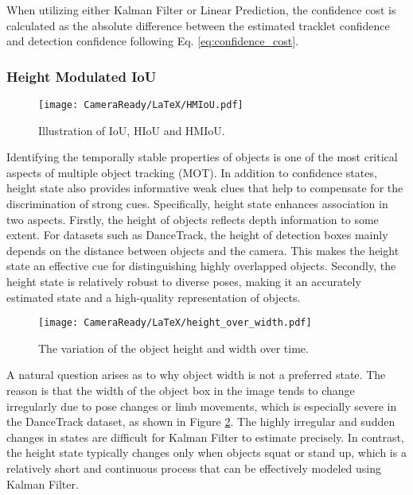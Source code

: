 \documentclass[letterpaper]{article} \usepackage{aaai23}  \usepackage{times}  \usepackage{helvet}  \usepackage{courier}  \usepackage[hyphens]{url}  \usepackage{graphicx} \urlstyle{rm} \def\UrlFont{\rm}  \usepackage{natbib}  \usepackage{caption} \frenchspacing  \setlength{\pdfpagewidth}{8.5in}  \setlength{\pdfpageheight}{11in}  \usepackage{algorithm}
\begin{document}
When utilizing either Kalman Filter or Linear Prediction, the confidence cost is calculated as the absolute difference between the estimated tracklet confidence  and detection confidence  following Eq. \ref{eq:confidence_cost}. 




\subsubsection{Height Modulated IoU}

\begin{figure}[ht]
\centering
\texttt{[image: CameraReady/LaTeX/HMIoU.pdf]} \caption{Illustration of IoU, HIoU and HMIoU.} \label{fig:HMIoU}
\end{figure}

Identifying the temporally stable properties of objects is one of the most critical aspects of multiple object tracking (MOT). In addition to confidence states, height state also provides informative weak clues that help to compensate for the discrimination of strong cues. Specifically, height state enhances association in two aspects. Firstly, the height of objects reflects depth information to some extent. For datasets such as DanceTrack, the height of detection boxes mainly depends on the distance between objects and the camera. This makes the height state an effective cue for distinguishing highly overlapped objects. Secondly, the height state is relatively robust to diverse poses, making it an accurately estimated state and a high-quality representation of objects. 

\begin{figure}[b]
\centering
\texttt{[image: CameraReady/LaTeX/height\_over\_width.pdf]} \caption{The variation of the object height and width over time.} \label{fig:height_over_width}
\end{figure}

A natural question arises as to why object width is not a preferred state. The reason is that the width of the object box in the image tends to change irregularly due to pose changes or limb movements, which is especially severe in the DanceTrack dataset, as shown in Figure \ref{fig:height_over_width}. The highly irregular and sudden changes in states are difficult for Kalman Filter to estimate precisely. In contrast, the height state typically changes only when objects squat or stand up, which is a relatively short and continuous process that can be effectively modeled using Kalman Filter.
\end{document}
